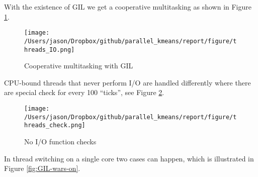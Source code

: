 \documentclass[a0paper,smallertitle]{HYposter}
\begin{document}
With the existence
of GIL we get a cooperative multitasking as shown in Figure \ref{fig:Cooperative-multitasking-with}.

\begin{figure}[H] 
\texttt{[image: /Users/jason/Dropbox/github/parallel\_kmeans/report/figure/threads\_IO.png]}
\caption{Cooperative multitasking with GIL} \label{fig:Cooperative-multitasking-with}
\end{figure}

CPU-bound threads that never perform I/O are handled differently where
there are special check for every 100 ``ticks'', see Figure \ref{fig:No-I/O-function}.

\begin{figure}[H] 
\texttt{[image: /Users/jason/Dropbox/github/parallel\_kmeans/report/figure/threads\_check.png]}
\caption{No I/O function checks}
\label{fig:No-I/O-function}
\end{figure}

In thread switching on a single core two cases can happen, which is illustrated in Figure \ref{fig:GIL-wars-on}. %
\end{document}
